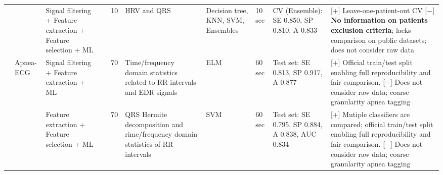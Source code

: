 \documentclass[5p,twocolumn,lefttitle]{elsarticle}
\begin{document}
\begin{table*}[!ht]
{\begin{tabularx}{2\textwidth}{@{}m{2.5em}p{7em}p{10em}lp{2em}p{12em}p{7em}p{3em}p{17em}X@{}}
                        \cmidrule(l){3-10} 
                            &                                                         &   Signal filtering + Feature extraction + Feature selection + ML                                          & \cite{bozkurt2020detection} & 10            & HRV and QRS                                                                                    & Decision tree, KNN, SVM, Ensembles                  & 10 sec                                     &  CV (Ensemble): SE 0.850, SP 0.810, A 0.833                                       & [+] Leave-one-patient-out CV [$-$] \textbf{No information on patients exclusion criteria}; lacks comparison on public datasets; does not consider raw data     \\   
                            
                            
        \cmidrule(l){2-10} 
                            & \multirow{13}{*}{Apnea-ECG}                             & Signal filtering + Feature extraction + ML                     & \cite{DBLP:conf/cinc/SadrC14}            & 70            & Time/frequency domain statistics related to RR intervals and EDR signals                                          & ELM                                 & 60 sec                                     & Test set: SE 0.813, SP 0.917, A 0.877                                                                                                                                                   & [+] Official train/test split enabling full reproducibility and fair comparison. [$-$] Does not consider raw data; coarse granularity apnea tagging                                                                                                                                                                                                                                                                                                    \\
                            \cmidrule(l){3-10} 
                            &                                                         & Feature extraction + Feature selection + ML                    & \cite{DBLP:journals/cbm/SharmaS16}       & 70            & QRS Hermite decomposition and rime/frequency domain statistics of RR intervals                                    & SVM                                 & 60 sec                                     & Test set: SE 0.795, SP 0.884, A 0.838, AUC 0.834                                                                                                                                         & [+] Mutiple classifiers are compared; official train/test split enabling full reproducibility and fair comparison. [$-$] Does not consider raw data; coarse granularity apnea tagging                                                                                                                                                                                                                                                                  \\

\end{tabularx}}
\end{table*}
\end{document}
